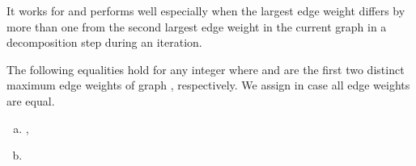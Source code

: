 \documentclass[runningheads,a4paper]{llncs}
\begin{document}
It works for 
and performs well especially when the largest edge weight differs  by
more than one from the second largest edge weight in the current graph
in a decomposition step during an iteration.

\begin{theorem}
\label{DecompositionTh_Modified}
The following equalities hold for any integer  where
 and  are the first two distinct maximum edge weights of graph
, respectively. We assign  in case all edge weights are
equal.
\begin{enumerate}[(a)]
\item \label{thm:dt:a} ,

\item

\end{enumerate}
\end{theorem}
\end{document}
